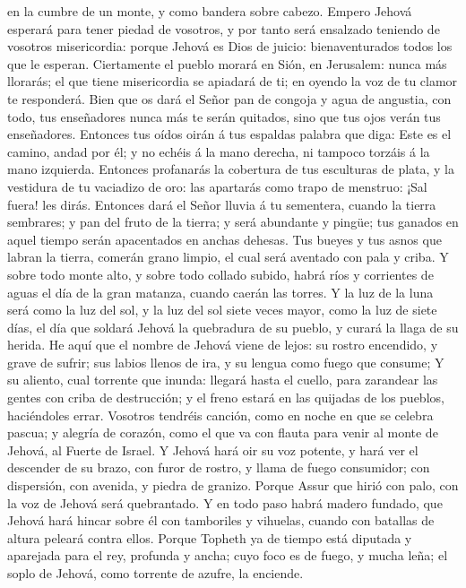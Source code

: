 en la cumbre de un monte, y como bandera sobre cabezo. 
Empero Jehová esperará para tener piedad de vosotros, y por tanto será
ensalzado teniendo de vosotros misericordia: porque Jehová es Dios de
juicio: bienaventurados todos los que le esperan. 
Ciertamente el pueblo morará en Sión, en Jerusalem: nunca más llorarás;
el que tiene misericordia se apiadará de ti; en oyendo la voz de tu
clamor te responderá.  Bien que os dará el Señor pan de
congoja y agua de angustia, con todo, tus enseñadores nunca más te serán
quitados, sino que tus ojos verán tus enseñadores. 
Entonces tus oídos oirán á tus espaldas palabra que diga: Este es el
camino, andad por él; y no echéis á la mano derecha, ni tampoco torzáis
á la mano izquierda.  Entonces profanarás la cobertura de
tus esculturas de plata, y la vestidura de tu vaciadizo de oro: las
apartarás como trapo de menstruo: ¡Sal fuera! les dirás. 
Entonces dará el Señor lluvia á tu sementera, cuando la tierra
sembrares; y pan del fruto de la tierra; y será abundante y pingüe; tus
ganados en aquel tiempo serán apacentados en anchas dehesas.
 Tus bueyes y tus asnos que labran la tierra, comerán grano
limpio, el cual será aventado con pala y criba.  Y sobre
todo monte alto, y sobre todo collado subido, habrá ríos y corrientes de
aguas el día de la gran matanza, cuando caerán las torres. 
Y la luz de la luna será como la luz del sol, y la luz del sol siete
veces mayor, como la luz de siete días, el día que soldará Jehová la
quebradura de su pueblo, y curará la llaga de su herida. 
He aquí que el nombre de Jehová viene de lejos: su rostro encendido, y
grave de sufrir; sus labios llenos de ira, y su lengua como fuego que
consume;  Y su aliento, cual torrente que inunda: llegará
hasta el cuello, para zarandear las gentes con criba de destrucción; y
el freno estará en las quijadas de los pueblos, haciéndoles errar.
 Vosotros tendréis canción, como en noche en que se celebra
pascua; y alegría de corazón, como el que va con flauta para venir al
monte de Jehová, al Fuerte de Israel.  Y Jehová hará oir su
voz potente, y hará ver el descender de su brazo, con furor de rostro, y
llama de fuego consumidor; con dispersión, con avenida, y piedra de
granizo.  Porque Assur que hirió con palo, con la voz de
Jehová será quebrantado.  Y en todo paso habrá madero
fundado, que Jehová hará hincar sobre él con tamboriles y vihuelas,
cuando con batallas de altura peleará contra ellos.  Porque
Topheth ya de tiempo está diputada y aparejada para el rey, profunda y
ancha; cuyo foco es de fuego, y mucha leña; el soplo de Jehová, como
torrente de azufre, la enciende.

